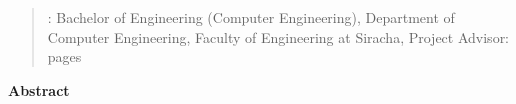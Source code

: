 \newpage
\begin{quote}
\the\year:
Bachelor of Engineering (Computer Engineering), Department of Computer Engineering, Faculty of Engineering at Siracha,
Project Advisor:
\pageref{LastPage} pages
\end{quote}
\vspace{0.2in}
\begin{center}
\textbf{\Huge Abstract}
\end{center}
\vspace{0.3in}


\hspace{-0.5in}
